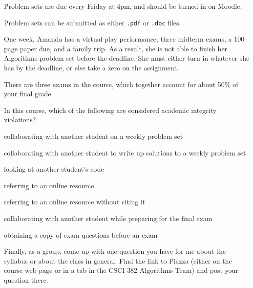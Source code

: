 \documentclass{tufte-handout}
\begin{document}
\begin{questions}

  \item Problem sets are due every Friday at 4pm, and should be turned
    in on Moodle.

  \item Problem sets can be submitted as either \texttt{.pdf} or
    \texttt{.doc} files.

  \item One week, Amanda has a virtual play performance, three midterm
    exams, a 100-page paper due, and a family trip.  As a result, she
    is not able to finish her Algorithms problem set before the
    deadline.  She must either turn in whatever she has by the
    deadline, or else take a zero on the assignment.
  \item There are three exams in the course, which together account
    for about 50\% of your final grade.
  \item In this course, which of the following are considered academic
    integrity violations? 
    \begin{compactenum}[(a)]
      \item collaborating with another student on a weekly problem set
      \item collaborating with another student to write up solutions
        to a weekly problem set
      \item looking at another student's code
      \item referring to an online resource
      \item referring to an online resource without citing it
      \item collaborating with another student while preparing for the
        final exam
      \item obtaining a copy of exam questions before an exam
      \end{compactenum} \bigskip

    \item Finally, as a group, come up with one question you have for
      me about the syllabus or about the class in general. Find the
      link to Piazza (either on the course web page or in a tab in the
      CSCI 382 Algorithms Team) and post your question there.
\end{questions}
\end{document}
